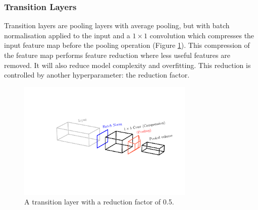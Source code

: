 \subsubsection{Transition Layers}
Transition layers are pooling layers with average pooling, but with batch normalisation applied to the input and a $1\times{}1$ convolution which compresses the input feature map before the pooling operation (Figure \ref{fig:machine_learning:transition_layer}). 
This compression of the feature map performs feature reduction where less useful features are removed. It will also reduce model complexity and overfitting. This reduction is controlled by another hyperparameter: the reduction factor. 
\begin{figure}[h!]
    \includegraphics[width=0.75\textwidth]{figures/machine_learning/transition_layer.pdf}
    \caption{A transition layer with a reduction factor of 0.5.}
        \label{fig:machine_learning:transition_layer}
\end{figure}


